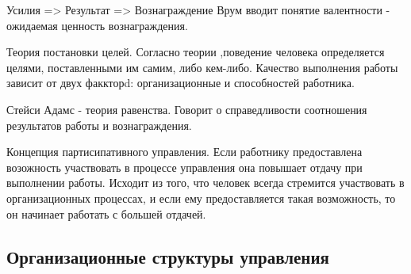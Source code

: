 \documentclass[a4paper,12pt]{report}
\begin{document}
	Усилия => Результат => Вознаграждение
	Врум вводит понятие валентности - ожидаемая ценность вознаграждения.


	Теория постановки целей.
	Согласно теории ,поведение человека определяется целями, поставленными им самим, либо кем-либо.
	Качество выполнения работы зависит от двух факкторd: организационные и способностей работника.



	Стейси Адамс - теория равенства.
	Говорит о справедливости соотношения результатов работы и вознаграждения.

	Концепция партисипативного управления.
	Если работнику предоставлена возожность участвовать в процессе управления она повышает отдачу при выполнении работы. Исходит из того, что человек всегда стремится участвовать в организационных процессах, и если ему предоставляется такая возможность, то он начинает работать с большей отдачей.




\subsection{Организационные структуры управления}
\end{document}
